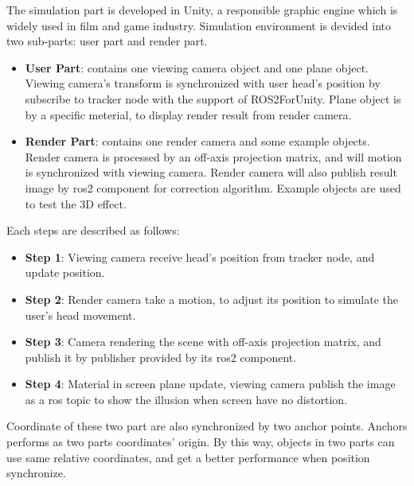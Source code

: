 The simulation part is developed in Unity, a responsible graphic engine which is widely used in film and game industry. Simulation environment is devided into two sub-parts: user part and render part.
\begin{itemize}
    \item \textbf{User Part}: contains one viewing camera object and one plane object. Viewing camera's transform is synchronized with user head's position by subscribe to tracker node with the support of ROS2ForUnity. Plane object is by a specific meterial, to display render result from render camera.
    \item \textbf{Render Part}: contains one render camera and some example objects. Render camera is processed by an off-axis projection matrix, and will motion is synchronized with viewing camera. Render camera will also publish result image by ros2 component for correction algorithm. Example objects are used to test the 3D effect.
\end{itemize}


Each steps are described as follows:
\begin{itemize}
    \item \textbf{Step 1}: Viewing camera receive head's position from tracker node, and update position.
    \item \textbf{Step 2}: Render camera take a motion, to adjust its position to simulate the user's head movement.
    \item \textbf{Step 3}: Camera rendering the scene with off-axis projection matrix, and publish it by publisher provided by its ros2 component.
    \item \textbf{Step 4}: Material in screen plane update, viewing camera publish the image as a ros topic to show the illusion when screen have no distortion.
\end{itemize}

Coordinate of these two part are also synchronized by two anchor points. Anchors performs as two parts coordinates' origin. By this way, objects in two parts can use same relative coordinates, and get a better performance when position synchronize.

